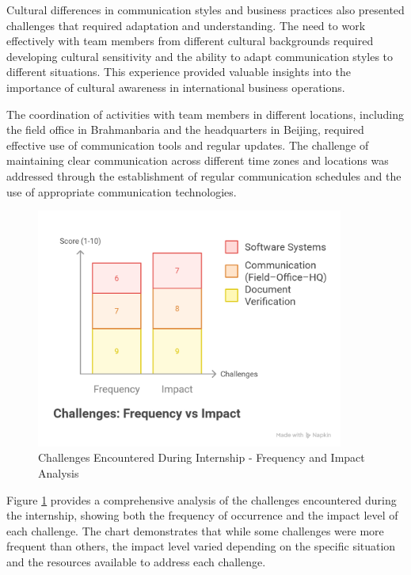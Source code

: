 Cultural differences in communication styles and business practices also presented challenges that required adaptation and understanding. The need to work effectively with team members from different cultural backgrounds required developing cultural sensitivity and the ability to adapt communication styles to different situations. This experience provided valuable insights into the importance of cultural awareness in international business operations.

The coordination of activities with team members in different locations, including the field office in Brahmanbaria and the headquarters in Beijing, required effective use of communication tools and regular updates. The challenge of maintaining clear communication across different time zones and locations was addressed through the establishment of regular communication schedules and the use of appropriate communication technologies.

\begin{figure}[H]
    \centering
    \includegraphics[width=0.9\textwidth]{assets/images/challenge_analysis_chart.png}
    \caption{Challenges Encountered During Internship - Frequency and Impact Analysis}
    \label{fig:challenge_analysis_chart}
\end{figure}

Figure \ref{fig:challenge_analysis_chart} provides a comprehensive analysis of the challenges encountered during the internship, showing both the frequency of occurrence and the impact level of each challenge. The chart demonstrates that while some challenges were more frequent than others, the impact level varied depending on the specific situation and the resources available to address each challenge.

